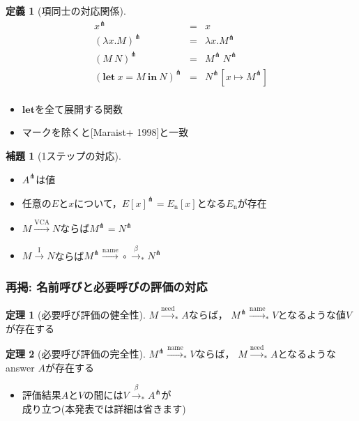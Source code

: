 \documentclass[dvipdfmx,cjk,xcolor=dvipsnames,envcountsect,notheorems,12pt]{beamer}
\theoremstyle{definition}
\newtheorem{definition}{定義}
\newtheorem{theorem}{定理}
\newtheorem{lemma}{補題}
\newcommand{\LET}[3]{\mathbf{let}~#1=#2~\mathbf{in}~#3}
\newcommand{\EXPANDLET}[1]{#1^\pitchfork}
\newcommand{\FULLBETA}{\xrightarrow{\beta}}
\newcommand{\CALLBYNEED}{\xrightarrow{\mathrm{need}}}
\newcommand{\CALLBYNEEDI}{\xrightarrow{\mathrm{I}}}
\newcommand{\CALLBYNEEDVCA}{\xrightarrow{\mathrm{VCA}}}
\newcommand{\CALLBYNAME}{\xrightarrow{\mathrm{name}}}
\newcommand{\RTCLOS}[1]{#1_*}
\begin{document}
\begin{frame}[fragile]
	\Large
	\begin{definition}[項同士の対応関係]
	\[ \begin{array}{rcl}
		\EXPANDLET{x} & = & x \\
		\EXPANDLET{(\lambda x. M)} & = & \lambda x. \EXPANDLET{M} \\
		\EXPANDLET{(M~N)} & = & \EXPANDLET{M}~\EXPANDLET{N} \\
		\EXPANDLET{(\LET{x}{M}{N})} & = & \EXPANDLET{N}[x \mapsto \EXPANDLET{M}] \\
	\end{array} \]
	\end{definition}
	\begin{itemize}
		\item $\mathbf{let}$を全て展開する関数
		\item マークを除くと[Maraist+ 1998]と一致
	\end{itemize}
\end{frame}

\begin{frame}
	\begin{lemma}[1ステップの対応]
	\begin{itemize}
		\item $\EXPANDLET{A}$は値
		\item 任意の$E$と$x$について，$\EXPANDLET{E[x]} = E_\mathrm{n}[x]$となる$E_\mathrm{n}$が存在
		\item $M \CALLBYNEEDVCA N$ならば$\EXPANDLET{M} = \EXPANDLET{N}$
		\item $M \CALLBYNEEDI N$ならば$\EXPANDLET{M}{\CALLBYNAME}\circ{\RTCLOS{\FULLBETA}} \EXPANDLET{N}$
	\end{itemize}
	\end{lemma}
\end{frame}

\begin{frame}
	\frametitle{再掲: 名前呼びと必要呼びの評価の対応}
	\Large
	\begin{theorem}[必要呼び評価の健全性]
		$M\RTCLOS{\CALLBYNEED}A$ならば，
		$\EXPANDLET{M}\RTCLOS{\CALLBYNAME}V$となるような値$V$が存在する
	\end{theorem}
	\begin{theorem}[必要呼び評価の完全性]
		$\EXPANDLET{M}\RTCLOS{\CALLBYNAME}V$ならば，
		$M\RTCLOS{\CALLBYNEED}A$となるようなanswer $A$が存在する
	\end{theorem}
	\begin{itemize}
		\item 評価結果$A$と$V$の間には$V\RTCLOS{\FULLBETA}\EXPANDLET{A}$が\\成り立つ(本発表では詳細は省きます)
	\end{itemize}
\end{frame}
\end{document}
